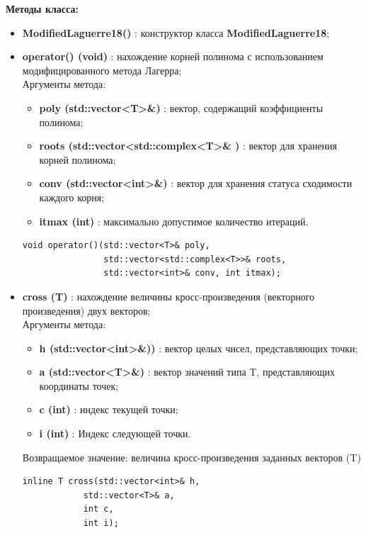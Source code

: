 \documentclass[a4paper,12pt]{article}
\begin{document}
\textbf{Методы класса:}
\begin{itemize}
    \item \textbf{ModifiedLaguerre18()} : конструктор класса \textbf{ModifiedLaguerre18};
    
    \item \textbf{operator() (void)} : нахождение корней полинома с использованием модифицированного метода Лагерра;
    \\Аргументы метода:
    \begin{itemize}
        \renewcommand{\labelitemi}{-}
        \item \textbf{poly (std::vector<T>\&)} : вектор, содержащий коэффициенты полинома;
        \item \textbf{roots (std::vector<std::complex<T>\& )} : вектор для хранения корней полинома;
        \item \textbf{conv (std::vector<int>\&)} : вектор для хранения статуса сходимости каждого корня;
        \item \textbf{itmax (int)} : максимально допустимое количество итераций.
    \end{itemize}
    \begin{lstlisting}[language=С++]
void operator()(std::vector<T>& poly, 
                std::vector<std::complex<T>>& roots, 
                std::vector<int>& conv, int itmax); \end{lstlisting}

    \item \textbf{cross (T)} : нахождение величины кросс-произведения (векторного произведения) двух векторов;
    \\Аргументы метода:
    \begin{itemize}
        \renewcommand{\labelitemi}{-}
        \item \textbf{h (std::vector<int>\&))} : вектор целых чисел, представляющих точки;
        \item \textbf{a (std::vector<T>\&)} : вектор значений типа T, представляющих координаты точек;
        \item \textbf{c (int)} : индекс текущей точки;
        \item \textbf{i (int)} : Индекс следующей точки.
    \end{itemize}
    
    Возвращаемое значение: величина кросс-произведения заданных векторов (T)

        \begin{lstlisting}[language=С++]
inline T cross(std::vector<int>& h, 
            std::vector<T>& a, 
            int c, 
            int i); \end{lstlisting}


\end{itemize}
\end{document}
